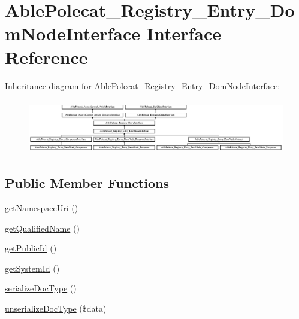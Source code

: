 \hypertarget{interface_able_polecat___registry___entry___dom_node_interface}{}\section{Able\+Polecat\+\_\+\+Registry\+\_\+\+Entry\+\_\+\+Dom\+Node\+Interface Interface Reference}
\label{interface_able_polecat___registry___entry___dom_node_interface}
Inheritance diagram for Able\+Polecat\+\_\+\+Registry\+\_\+\+Entry\+\_\+\+Dom\+Node\+Interface\+:\begin{figure}[H]
\begin{center}
\leavevmode
\includegraphics[height=2.386364cm]{interface_able_polecat___registry___entry___dom_node_interface}
\end{center}
\end{figure}
\subsection*{Public Member Functions}
\begin{DoxyCompactItemize}
\item 
\hyperlink{interface_able_polecat___registry___entry___dom_node_interface_a88cf6b8ffab972f8db5d3312df206576}{get\+Namespace\+Uri} ()
\item 
\hyperlink{interface_able_polecat___registry___entry___dom_node_interface_ae39fb2f89f278e0702f6a55b616dd855}{get\+Qualified\+Name} ()
\item 
\hyperlink{interface_able_polecat___registry___entry___dom_node_interface_ac02f76ee2955927eb4e4e3324048cdc4}{get\+Public\+Id} ()
\item 
\hyperlink{interface_able_polecat___registry___entry___dom_node_interface_aface5fb500be28f11fe0014e401b806e}{get\+System\+Id} ()
\item 
\hyperlink{interface_able_polecat___registry___entry___dom_node_interface_af2894f245118181699270b3218a86178}{serialize\+Doc\+Type} ()
\item 
\hyperlink{interface_able_polecat___registry___entry___dom_node_interface_aafcf863b2a7a62d48806270ef03a8c2d}{unserialize\+Doc\+Type} (\$data)
\end{DoxyCompactItemize}
